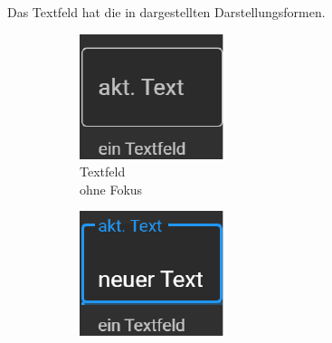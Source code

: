 Das Textfeld hat die in  dargestellten Darstellungsformen.
\begin{figure}[ht]
  \centering
  \hspace{0.05\textwidth}
  \begin{subfigure}[h]{0.24\textwidth}
    \centering
    \includegraphics[width=\textwidth]{content/hauptteil/umsetzungPoC/frontend/res/TextfeldNoFokus.pdf}
    \caption{Textfeld \\ohne Fokus}
    \label{fig:frontend:poc:textFeld:noFocus}
  \end{subfigure}
  \hfill
  \begin{subfigure}[h]{0.24\textwidth}
    \centering
    \includegraphics[width=\textwidth]{content/hauptteil/umsetzungPoC/frontend/res/TextfeldFokus.pdf}

\end{subfigure}
\end{figure}
